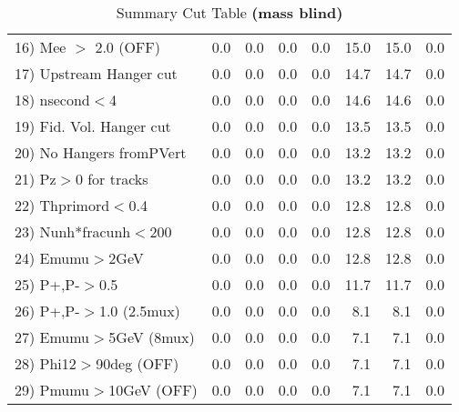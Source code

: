 \begin{table}[h!]
{{\begin{tabular}{||l||r|r|r|r|r||r||r||}
 16) Mee $>$ 2.0  (OFF)   &       0.0 &       0.0 &       0.0 &       0.0 &      15.0 &      15.0 &       0.0 \\
 17) Upstream Hanger cut  &       0.0 &       0.0 &       0.0 &       0.0 &      14.7 &      14.7 &       0.0 \\
 18) nsecond$<$4          &       0.0 &       0.0 &       0.0 &       0.0 &      14.6 &      14.6 &       0.0 \\
 19) Fid. Vol. Hanger cut &       0.0 &       0.0 &       0.0 &       0.0 &      13.5 &      13.5 &       0.0 \\
 20) No Hangers fromPVert &       0.0 &       0.0 &       0.0 &       0.0 &      13.2 &      13.2 &       0.0 \\
 21) Pz$>$0 for tracks    &       0.0 &       0.0 &       0.0 &       0.0 &      13.2 &      13.2 &       0.0 \\
 22) Thprimord$<$0.4      &       0.0 &       0.0 &       0.0 &       0.0 &      12.8 &      12.8 &       0.0 \\
 23) Nunh*fracunh$<$200   &       0.0 &       0.0 &       0.0 &       0.0 &      12.8 &      12.8 &       0.0 \\
 24) Emumu$>$2GeV         &       0.0 &       0.0 &       0.0 &       0.0 &      12.8 &      12.8 &       0.0 \\
 25) P+,P-$>$0.5          &       0.0 &       0.0 &       0.0 &       0.0 &      11.7 &      11.7 &       0.0 \\
 26) P+,P-$>$1.0 (2.5mux) &       0.0 &       0.0 &       0.0 &       0.0 &       8.1 &       8.1 &       0.0 \\
 27) Emumu$>$5GeV  (8mux) &       0.0 &       0.0 &       0.0 &       0.0 &       7.1 &       7.1 &       0.0 \\
 28) Phi12$>$90deg  (OFF) &       0.0 &       0.0 &       0.0 &       0.0 &       7.1 &       7.1 &       0.0 \\
 29) Pmumu$>$10GeV  (OFF) &       0.0 &       0.0 &       0.0 &       0.0 &       7.1 &       7.1 &       0.0 \\
 \hline
 \hline
 \end{tabular}
 \caption{Summary Cut Table \textbf{ (mass blind)}}
 \label{tab-sumcut}
 }}
 \end{table}
 \endinput
